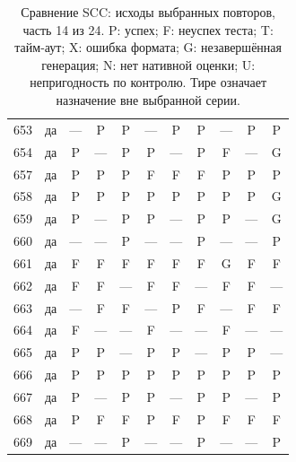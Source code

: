 \begin{table}[p]
\begin{tabular*}{\textwidth}{@{\extracolsep{\fill}}rc*{9}{c}@{}}
653 & да & — & P & P & — & P & P & — & P & P\\
654 & да & P & — & P & P & — & P & F & — & G\\
657 & да & P & P & P & F & F & F & P & P & P\\
658 & да & P & P & P & P & P & P & P & P & G\\
659 & да & P & — & P & P & — & P & P & — & G\\
660 & да & — & — & P & — & — & P & — & — & P\\
661 & да & F & F & F & F & F & F & G & F & F\\
662 & да & F & F & — & F & F & — & F & F & —\\
663 & да & — & F & F & — & P & F & — & F & F\\
664 & да & F & — & — & F & — & — & F & — & —\\
665 & да & P & P & — & P & P & — & P & P & —\\
666 & да & P & P & P & P & P & P & P & P & P\\
667 & да & P & — & P & P & — & P & P & — & P\\
668 & да & P & F & F & P & F & P & F & F & F\\
669 & да & — & — & P & — & — & P & — & — & P\\
\bottomrule\end{tabular*}
\caption{Сравнение SCC: исходы выбранных повторов, часть 14 из 24. P: успех; F: неуспех теста; T: тайм-аут; X: ошибка формата; G: незавершённая генерация; N: нет нативной оценки; U: непригодность по контролю. Тире означает назначение вне выбранной серии.}
\end{table}
\clearpage
